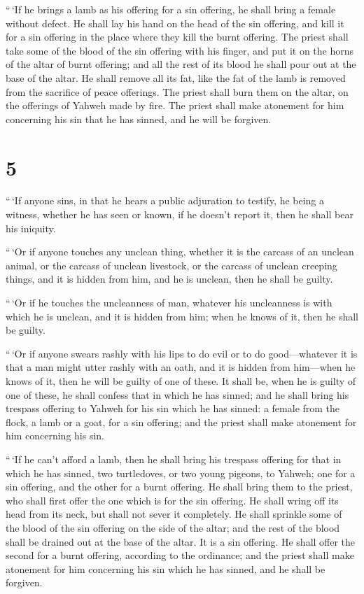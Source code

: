  ``\,`If he brings a lamb as his offering for a sin
offering, he shall bring a female without defect.  He shall
lay his hand on the head of the sin offering, and kill it for a sin
offering in the place where they kill the burnt offering. 
The priest shall take some of the blood of the sin offering with his
finger, and put it on the horns of the altar of burnt offering; and all
the rest of its blood he shall pour out at the base of the altar.
 He shall remove all its fat, like the fat of the lamb is
removed from the sacrifice of peace offerings. The priest shall burn
them on the altar, on the offerings of Yahweh made by fire. The priest
shall make atonement for him concerning his sin that he has sinned, and
he will be forgiven.

\hypertarget{section-4}{%
\section{5}\label{section-4}}

 ``\,`If anyone sins, in that he hears a public adjuration
to testify, he being a witness, whether he has seen or known, if he
doesn't report it, then he shall bear his iniquity.

 ``\,`Or if anyone touches any unclean thing, whether it is
the carcass of an unclean animal, or the carcass of unclean livestock,
or the carcass of unclean creeping things, and it is hidden from him,
and he is unclean, then he shall be guilty.

 ``\,`Or if he touches the uncleanness of man, whatever his
uncleanness is with which he is unclean, and it is hidden from him; when
he knows of it, then he shall be guilty.

 ``\,`Or if anyone swears rashly with his lips to do evil or
to do good---whatever it is that a man might utter rashly with an oath,
and it is hidden from him---when he knows of it, then he will be guilty
of one of these.  It shall be, when he is guilty of one of
these, he shall confess that in which he has sinned;  and he
shall bring his trespass offering to Yahweh for his sin which he has
sinned: a female from the flock, a lamb or a goat, for a sin offering;
and the priest shall make atonement for him concerning his sin.

 ``\,`If he can't afford a lamb, then he shall bring his
trespass offering for that in which he has sinned, two turtledoves, or
two young pigeons, to Yahweh; one for a sin offering, and the other for
a burnt offering.  He shall bring them to the priest, who
shall first offer the one which is for the sin offering. He shall wring
off its head from its neck, but shall not sever it completely.
 He shall sprinkle some of the blood of the sin offering on
the side of the altar; and the rest of the blood shall be drained out at
the base of the altar. It is a sin offering.  He shall
offer the second for a burnt offering, according to the ordinance; and
the priest shall make atonement for him concerning his sin which he has
sinned, and he shall be forgiven.

